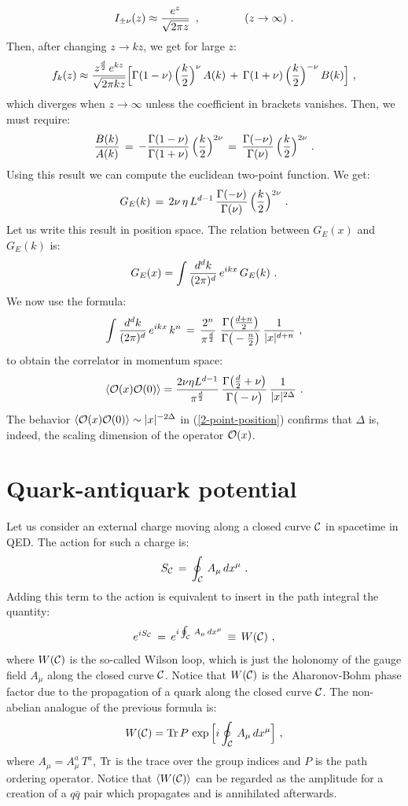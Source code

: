 \documentclass[12pt,notitlepage]{article}
\newcommand{\beq}{\begin{equation}}
\newcommand{\eeq}{\end{equation}}
\begin{document}
\beq
I_{\pm \nu}(z)\approx {e^{z}\over \sqrt{2\pi z}}
\,\,\,,
\qquad\qquad 
(z\to\infty)\,\,.
\eeq
Then, after changing $z\to kz$, we get for large $z$:
\beq
f_k(z)\approx {z^{{d\over 2}}\,e^{kz}\over \sqrt{2\pi kz}}
\Big[
\Gamma(1- \nu)\,\Big({k\over 2}\Big)^{\nu}\,A(k)\,+\,
\Gamma(1+ \nu)\,\Big({k\over 2}\Big)^{-\nu}\,B(k)\Big]\,\,,
\eeq
which diverges when $z\to\infty$ unless the coefficient in brackets vanishes. Then, we must require:
\beq
{B(k)\over A(k)}\,=\,-{\Gamma(1-\nu)\over \Gamma(1+\nu)}\,
\Big({k\over 2}\Big)^{2\nu}\,=\,{\Gamma(-\nu)\over \Gamma(\nu)}\,
\Big({k\over 2}\Big)^{2\nu}\,\,.
\eeq
Using this result we can compute the  euclidean two-point function. We get:
\beq
G_E(k)\,=\,2\nu\,\eta \,L^{d-1}\,
{\Gamma(-\nu)\over \Gamma(\nu)}\,
\Big({k\over 2}\Big)^{2\nu}\,\,.
\eeq
Let us write this result in position space. The relation between $G_E(x)$ and $G_E(k)$ is: 
\beq
G_E(x)=\int {d^dk\over (2\pi)^d}\,e^{ikx}\,G_E(k)\,\,.
\eeq
We now use the formula:
\beq
\int {d^dk\over (2\pi)^d}\,e^{ikx}\,k^n\,=\,
{2^n\over \pi^{{d\over 2}}}\,\,
{\Gamma\big({d+n\over 2}\big)\over 
\Gamma\big(-{n\over 2}\big)}\,
{1\over |x|^{d+n}}\,\,,
\eeq
to obtain the correlator in momentum space:
\beq
\langle {\cal O}(x) {\cal O}(0)\rangle=
{2\nu \eta  L^{d-1}\over \pi^{{d\over 2}}}\,
{\Gamma\big({d\over 2}+\nu\big)\over 
\Gamma\big(-\nu\big)}\,
{1\over |x|^{2\Delta}}\,\,.
\label{2-point-position}
\eeq
The behavior $\langle {\cal O}(x) {\cal O}(0)\rangle\sim |x|^{-2\Delta}$ in (\ref{2-point-position}) confirms that $\Delta$ is, indeed,  the scaling dimension of the operator ${\cal O}(x)$. 



\section{Quark-antiquark potential}

Let us consider an external charge moving along a closed curve ${\cal C}$ in spacetime in QED. The action for such a charge is:
\beq
S_{{\cal C}}\,=\,\oint_{{\cal C}}\,A_{\mu}\,dx^{\mu}\,\,.
\eeq
Adding this term to the action is equivalent to insert in the path integral the quantity:
\beq
e^{iS_{{\cal C}}}\,=\,e^{i\oint_{{\cal C}}\,A_{\mu}\,dx^{\mu}}\,
\equiv \,W({\cal C})\,\,,
\eeq
where $W({\cal C})$ is the so-called Wilson loop, which is just the holonomy of the gauge field $A_{\mu}$ along the closed curve ${\cal C}$. Notice that $W({\cal C})$ is the Aharonov-Bohm phase factor due to the propagation of a quark along the closed curve ${\cal C}$. The non-abelian analogue of the previous formula is:
\beq
W({\cal C})={\rm Tr}\,P\,\exp\Big[i\oint_{{\cal C}}\,A_{\mu}\,dx^{\mu}\Big]\,\,,
\eeq
where $A_{\mu}=A_{\mu}^a\,T^a$, ${\rm Tr}$ is the trace over the group indices and $P$ is the path ordering operator. Notice that $\langle W({\cal C}) \rangle$ can be regarded as the amplitude for a creation of a $q\bar q$ pair which propagates and is annihilated afterwards. 
\end{document}
